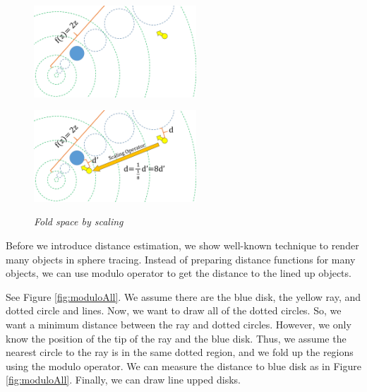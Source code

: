 \begin{figure}[htbp]
 \begin{minipage}[t]{0.5\hsize}
  \center
  \includegraphics[height=1.35in, keepaspectratio]{img/visualization/scaling1.png}
  \subcaption{\textit{}}
  \label{fig:iisScale1}
  \hspace*{\fill}
 \end{minipage}
 \begin{minipage}[t]{0.5\hsize}
  \center
  \includegraphics[height=1.35in, keepaspectratio]{img/visualization/scaling2.png}
  \subcaption{\textit{}}
  \label{fig:iisScale2}
  \hspace*{\fill}
 \end{minipage}
 \caption{\textit{Fold space by scaling}}
 \label{fig:iisScaleAll}
\end{figure}

Before we introduce distance estimation, we show
well-known technique to render many objects in sphere tracing.
Instead of preparing distance functions for many objects, we can use modulo operator
to get the distance to the lined up objects.

See Figure \ref{fig:moduloAll}. We assume there are the blue disk, the
yellow ray, and dotted circle and lines.
Now, we want to draw all of the dotted circles.
So, we want a minimum distance between the ray and dotted circles.
However, we only know the position of the tip of the ray and the blue disk.
Thus, we assume the nearest circle to the ray is in the same dotted region, and
we fold up the regions using the modulo operator.
We can measure the distance to blue disk as in Figure \ref{fig:moduloAll}.
Finally, we can draw line upped disks.

